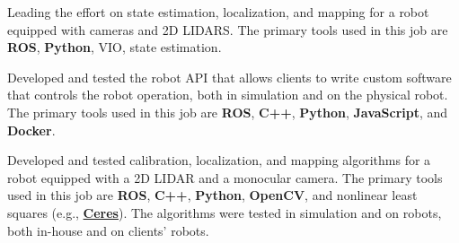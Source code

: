 \documentclass[10pt,letter]{altacv}
\begin{document}
\tagline{}


\begin{fullwidth}
\makecvheader
\end{fullwidth}


Leading the effort on state estimation, localization, and mapping for a robot equipped with cameras and 2D LIDARS.
The primary tools used in this job are \textbf{ROS}, \textbf{Python}, VIO, state estimation.

\divider

Developed and tested the robot API that allows clients to write custom software that controls the robot operation, both in simulation and on the physical robot.
The primary tools used in this job are \textbf{ROS}, \textbf{C++}, \textbf{Python}, \textbf{JavaScript}, and \textbf{Docker}.

\divider

Developed and tested calibration, localization, and mapping algorithms for a robot equipped with a 2D LIDAR and a monocular camera.
The primary tools used in this job are \textbf{ROS}, \textbf{C++}, \textbf{Python}, \textbf{OpenCV}, and nonlinear least squares (e.g., \href{https://github.com/ceres-solver/ceres-solver}{\textbf{Ceres}}).
The algorithms were tested in simulation and on robots, both in-house and on clients' robots.
\end{document}
